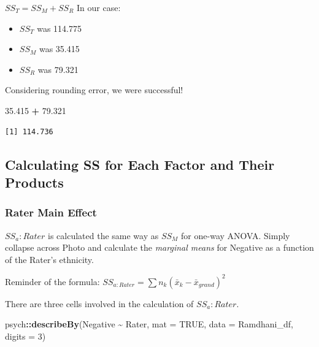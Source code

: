 \documentclass[
  11pt,
]{book}
\newenvironment{Shaded}{\begin{snugshade}}{\end{snugshade}}
\newcommand{\AttributeTok}[1]{\textcolor[rgb]{0.27,0.27,0.27}{#1}}
\newcommand{\ConstantTok}[1]{\textcolor[rgb]{0.37,0.37,0.37}{#1}}
\newcommand{\DecValTok}[1]{\textcolor[rgb]{0.06,0.06,0.06}{#1}}
\newcommand{\FloatTok}[1]{\textcolor[rgb]{0.06,0.06,0.06}{#1}}
\newcommand{\FunctionTok}[1]{\textcolor[rgb]{0.27,0.27,0.27}{\textbf{#1}}}
\newcommand{\NormalTok}[1]{#1}
\newcommand{\SpecialCharTok}[1]{\textcolor[rgb]{0.43,0.43,0.43}{\textbf{#1}}}
\providecommand{\tightlist}{%
  \setlength{\itemsep}{0pt}\setlength{\parskip}{0pt}}
\begin{document}
\(SS_T = SS_M + SS_R\) In our case:

\begin{itemize}
\tightlist
\item
  \(SS_T\) was 114.775
\item
  \(SS_M\) was 35.415
\item
  \(SS_R\) was 79.321
\end{itemize}

Considering rounding error, we were successful!

\begin{Shaded}
\begin{Highlighting}[]
\FloatTok{35.415} \SpecialCharTok{+} \FloatTok{79.321}
\end{Highlighting}
\end{Shaded}

\begin{verbatim}
[1] 114.736
\end{verbatim}

\hypertarget{calculating-ss-for-each-factor-and-their-products}{%
\subsection{Calculating SS for Each Factor and Their Products}\label{calculating-ss-for-each-factor-and-their-products}}

\hypertarget{rater-main-effect}{%
\subsubsection{Rater Main Effect}\label{rater-main-effect}}

\(SS_a:Rater\) is calculated the same way as \(SS_M\) for one-way ANOVA. Simply collapse across Photo and calculate the \emph{marginal means} for Negative as a function of the Rater's ethnicity.

Reminder of the formula: \(SS_{a:Rater}= \sum n_{k}(\bar{x}_{k}-\bar{x}_{grand})^{2}\)

There are three cells involved in the calculation of \(SS_a:Rater\).

\begin{Shaded}
\begin{Highlighting}[]
\NormalTok{psych}\SpecialCharTok{::}\FunctionTok{describeBy}\NormalTok{(Negative }\SpecialCharTok{\textasciitilde{}}\NormalTok{ Rater, }\AttributeTok{mat =} \ConstantTok{TRUE}\NormalTok{, }\AttributeTok{data =}\NormalTok{ Ramdhani\_df, }\AttributeTok{digits =} \DecValTok{3}\NormalTok{)}
\end{Highlighting}
\end{Shaded}
\end{document}
